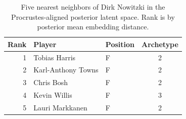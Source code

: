 \begin{table}[htbp]
  \centering\small
  \begin{tabular}{rllc}
    \toprule
    Rank & Player & Position & Archetype \\
    \midrule
    1 & Tobias Harris & F & 2 \\
    2 & Karl-Anthony Towns & F & 2 \\
    3 & Chris Bosh & F & 2 \\
    4 & Kevin Willis & F & 3 \\
    5 & Lauri Markkanen & F & 2 \\
    \bottomrule
  \end{tabular}
  \caption{Five nearest neighbors of Dirk Nowitzki in the Procrustes-aligned posterior latent space. Rank is by posterior mean embedding distance.}
  \label{tab:Dirk_Nowitzki_neighbors}
\end{table}

